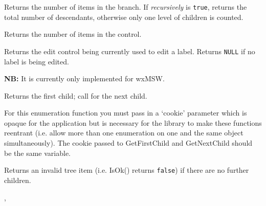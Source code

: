 Returns the number of items in the branch. If {\it recursively} is {\tt true}, returns the total number
of descendants, otherwise only one level of children is counted.


\label{wxtreectrlgetcount}


Returns the number of items in the control.


\label{wxtreectrlgeteditcontrol}


Returns the edit control being currently used to edit a label. Returns {\tt NULL}
if no label is being edited.

{\bf NB:} It is currently only implemented for wxMSW.


\label{wxtreectrlgetfirstchild}


Returns the first child; call  for the next child.

For this enumeration function you must pass in a `cookie' parameter
which is opaque for the application but is necessary for the library
to make these functions reentrant (i.e. allow more than one
enumeration on one and the same object simultaneously). The cookie passed to
GetFirstChild and GetNextChild should be the same variable.

Returns an invalid tree item (i.e. IsOk() returns {\tt false}) if there are no further children.


,




\label{wxtreectrlgetfirstvisibleitem}



